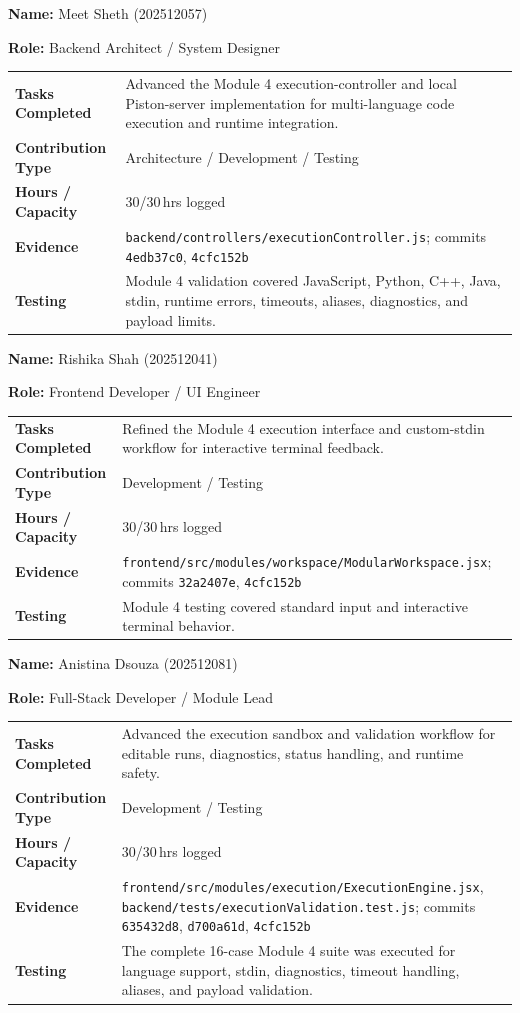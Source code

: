 \documentclass[11pt,a4paper]{article}
\newcommand{\field}[2]{\textbf{#1:} #2\par}
\begin{document}
\field{Name}{Meet Sheth (202512057)}
\field{Role}{Backend Architect / System Designer}
{\small
\begin{tabular}{>{\bfseries}p{} p{}}
\toprule
Tasks Completed & Advanced the Module 4 execution-controller and local Piston-server implementation for multi-language code execution and runtime integration. \\
Contribution Type & Architecture / Development / Testing \\
Hours / Capacity & 30/30\,hrs logged \\
Evidence & \texttt{backend/controllers/executionController.js}; commits \texttt{4edb37c0}, \texttt{4cfc152b} \\
Testing & Module 4 validation covered JavaScript, Python, C++, Java, stdin, runtime errors, timeouts, aliases, diagnostics, and payload limits. \\
\bottomrule
\end{tabular}
}

\field{Name}{Rishika Shah (202512041)}
\field{Role}{Frontend Developer / UI Engineer}
{\small
\begin{tabular}{>{\bfseries}p{} p{}}
\toprule
Tasks Completed & Refined the Module 4 execution interface and custom-stdin workflow for interactive terminal feedback. \\
Contribution Type & Development / Testing \\
Hours / Capacity & 30/30\,hrs logged \\
Evidence & \texttt{frontend/src/modules/workspace/ModularWorkspace.jsx}; commits \texttt{32a2407e}, \texttt{4cfc152b} \\
Testing & Module 4 testing covered standard input and interactive terminal behavior. \\
\bottomrule
\end{tabular}
}

\field{Name}{Anistina Dsouza (202512081)}
\field{Role}{Full-Stack Developer / Module Lead}
{\small
\begin{tabular}{>{\bfseries}p{} p{}}
\toprule
Tasks Completed & Advanced the execution sandbox and validation workflow for editable runs, diagnostics, status handling, and runtime safety. \\
Contribution Type & Development / Testing \\
Hours / Capacity & 30/30\,hrs logged \\
Evidence & \texttt{frontend/src/modules/execution/ExecutionEngine.jsx}, \texttt{backend/tests/executionValidation.test.js}; commits \texttt{635432d8}, \texttt{d700a61d}, \texttt{4cfc152b} \\
Testing & The complete 16-case Module 4 suite was executed for language support, stdin, diagnostics, timeout handling, aliases, and payload validation. \\
\bottomrule
\end{tabular}
}
\end{document}
